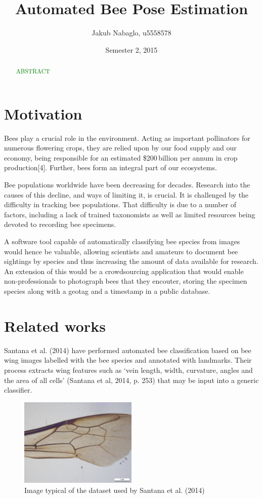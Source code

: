 \documentclass[11pt, oneside]{report}
\title{Automated Bee Pose Estimation}
\author{Jakub Nabaglo, u5558578}
\date{Semester 2, 2015}
\newcommand{\pcomment}[1]{\textcolor{green}{#1}}
\begin{document}
\maketitle

\begin{abstract}
    \pcomment{ABSTRACT}
\end{abstract}

\tableofcontents\newpage

\chapter{Motivation}
    Bees play a crucial role in the environment. Acting as important pollinators for numerous flowering crops, they are relied upon by our food supply and our economy, being responsible for an estimated \$200\,billion per annum in crop production[4]. Further, bees form an integral part of our ecosystems.

    Bee populations worldwide have been decreasing for decades. Research into the causes of this decline, and ways of limiting it, is crucial. It is challenged by the difficulty in tracking bee populations. That difficulty is due to a number of factors, including a lack of trained taxonomists as well as limited resources being devoted to recording bee specimens.

    A software tool capable of automatically classifying bee species from images would hence be valuable, allowing scientists and amateurs to document bee sightings by species and thus increasing the amount of data available for research. An extension of this would be a crowdsourcing application that would enable non-professionals to photograph bees that they encouter, storing the specimen species along with a geotag and a timestamp in a public database.

\chapter{Related works}
    Santana et al. (2014) have performed automated bee classification based on bee wing images labelled with the bee species and annotated with landmarks. Their process extracts wing features such as `vein length, width, curvature, angles and the area of all cells' (Santana et al, 2014, p. 253) that may be input into a generic classifier.

    \begin{figure}
        \includegraphics[width=0.5\textwidth]{santana.jpg}
        \caption{Image typical of the dataset used by Santana et al. (2014)}
        \label{fig:santana_example}
    \end{figure}
\end{document}
